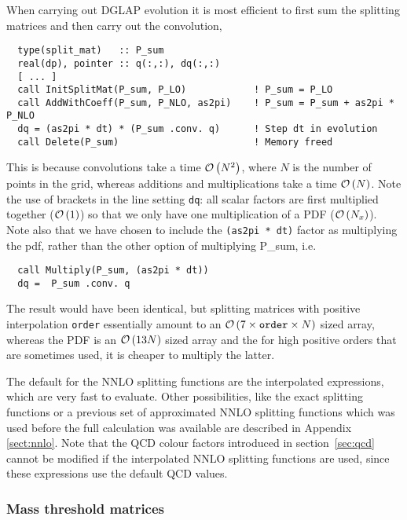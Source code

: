 \documentclass[12pt]{article}
\newcommand{\ie}{i.e.\ }
\newcommand{\ttt}[1]{\texttt{#1}}
\newcommand{\order}[1]{{\cal O}\left(#1\right)}
\begin{document}
When carrying out DGLAP evolution it is most
efficient to first sum the splitting matrices and then carry out the
convolution,
\begin{lstlisting}
  type(split_mat)   :: P_sum
  real(dp), pointer :: q(:,:), dq(:,:)
  [ ... ]
  call InitSplitMat(P_sum, P_LO)            ! P_sum = P_LO
  call AddWithCoeff(P_sum, P_NLO, as2pi)    ! P_sum = P_sum + as2pi * P_NLO
  dq = (as2pi * dt) * (P_sum .conv. q)      ! Step dt in evolution
  call Delete(P_sum)                        ! Memory freed
\end{lstlisting}
This is because convolutions take a time $\order{N^2}$, where $N$ is the
number of points in the grid, whereas additions and multiplications
take a time $\order{N}$.
%
Note the use of brackets in the line setting \ttt{dq}: all scalar
factors are first multiplied together ($\order{1}$) so that we only
have one multiplication of a PDF ($\order{N_x}$). Note also that we have
chosen to include the \ttt{(as2pi * dt)} factor as multiplying the
pdf, rather than the other option of multiplying {P\_sum}, \ie 
\begin{lstlisting}
  call Multiply(P_sum, (as2pi * dt))
  dq =  P_sum .conv. q
\end{lstlisting}
The result would have been identical, but splitting matrices with
positive interpolation \ttt{order} essentially amount to an
$\order{7\times \ttt{order} \times N}$ sized array, whereas the PDF is
an $\order{13 N}$ sized array and the for high positive orders that
are sometimes used, it is cheaper to multiply the latter. 

The default for the NNLO splitting functions are the interpolated
expressions, which are very fast
to evaluate. Other possibilities, like
the exact splitting functions or a previous set of approximated NNLO
splitting functions which was used before the full
calculation was available are described in Appendix \ref{sect:nnlo}.
Note that the QCD colour factors introduced in section~\ref{sec:qcd}
cannot be modified if the interpolated NNLO splitting functions
are used, since these expressions use the default QCD values.





\subsubsection{Mass threshold matrices}
\label{sec:mtm}
\end{document}
